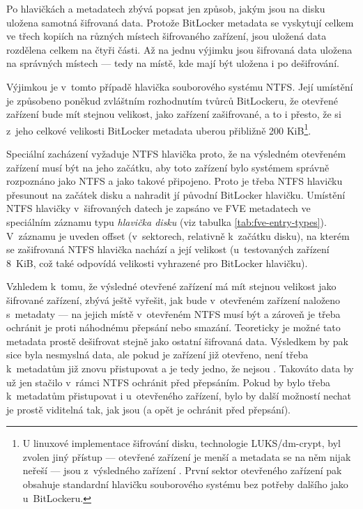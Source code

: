 Po hlavičkách a metadatech zbývá popsat jen způsob, jakým jsou na disku uložena samotná šifrovaná data. Protože BitLocker metadata se vyskytují celkem ve třech kopiích na různých místech  šifrovaného zařízení, jsou uložená data rozdělena celkem na čtyři části. Až na jednu výjimku jsou šifrovaná data uložena na správných místech --- tedy na místě, kde mají být uložena i po dešifrování.

Výjimkou je v~tomto případě hlavička souborového systému NTFS. Její umístění je způsobeno poněkud zvláštním rozhodnutím tvůrců BitLockeru, že otevřené zařízení bude mít stejnou velikost, jako zařízení zašifrované, a to i přesto, že si z~jeho celkové velikosti BitLocker metadata uberou přibližně 200 KiB\footnote{U linuxové implementace šifrování disku, technologie LUKS/dm-crypt, byl zvolen jiný přístup --- otevřené zařízení je menší a metadata se na něm nijak neřeší --- jsou z~výsledného zařízení . První sektor otevřeného zařízení pak obsahuje standardní hlavičku souborového systému bez potřeby dalšího  jako u~BitLockeru.}.


Speciální zacházení vyžaduje NTFS hlavička proto, že na výsledném otevřeném zařízení musí být na jeho začátku, aby toto zařízení bylo systémem správně rozpoznáno jako NTFS a jako takové připojeno. Proto je třeba NTFS hlavičku přesunout na začátek disku a nahradit jí původní BitLocker hlavičku. Umístění NTFS hlavičky v~šifrovaných datech je zapsáno ve FVE metadatech ve speciálním záznamu typu \emph{hlavička disku} (viz tabulka \ref{tab:fve-entry-types}). V~záznamu je uveden offset (v~sektorech, relativně k~začátku disku), na kterém se zašifrovaná NTFS hlavička nachází a její velikost (u~testovaných zařízení 8~KiB, což také odpovídá velikosti vyhrazené pro BitLocker hlavičku).

Vzhledem k~tomu, že výsledné otevřené zařízení má mít stejnou velikost jako šifrované zařízení, zbývá ještě vyřešit, jak bude v~otevřeném zařízení naloženo s~metadaty --- na jejich místě v~otevřeném NTFS musí  být a zároveň je třeba ochránit je proti náhodnému přepsání nebo smazání. Teoreticky je možné tato metadata prostě dešifrovat stejně jako ostatní šifrovaná data. Výsledkem by pak sice byla nesmyslná data, ale pokud je zařízení již otevřeno, není třeba k~metadatům již znovu přistupovat a je tedy jedno, že nejsou . Takováto  data by už jen stačilo v~rámci NTFS ochránit před přepsáním. Pokud by bylo třeba k~metadatům přistupovat i u~otevřeného zařízení, bylo by další možností nechat je prostě viditelná tak, jak jsou (a opět je ochránit před přepsání).

